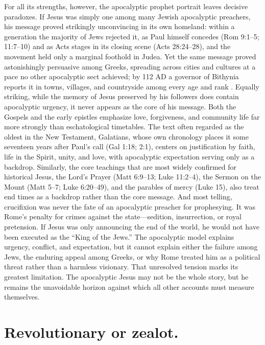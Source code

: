 For all its strengths, however, the apocalyptic prophet portrait leaves decisive paradoxes.
If Jesus was simply one among many Jewish apocalyptic preachers, his message proved strikingly unconvincing in its own homeland: within a generation the majority of Jews rejected it, as Paul himself concedes (Rom 9:1--5; 11:7--10) and as Acts stages in its closing scene (Acts 28:24--28), and the movement held only a marginal foothold in Judea.
Yet the same message proved astonishingly persuasive among Greeks, spreading across cities and cultures at a pace no other apocalyptic sect achieved; by 112 AD a governor of Bithynia reports it in towns, villages, and countryside among every age and rank \cite[10.96]{pliny:letters}.
Equally striking, while the memory of Jesus preserved by his followers does contain apocalyptic urgency, it never appears as the core of his message.
Both the Gospels and the early epistles emphasize love, forgiveness, and community life far more strongly than eschatological timetables.
The text often regarded as the oldest in the New Testament, Galatians, whose own chronology places it some seventeen years after Paul's call (Gal 1:18; 2:1), centers on justification by faith, life in the Spirit, unity, and love, with apocalyptic expectation serving only as a backdrop.
Similarly, the core teachings that are most widely confirmed for historical Jesus, the Lord's Prayer (Matt 6:9--13; Luke 11:2--4), the Sermon on the Mount (Matt 5--7; Luke 6:20--49), and the parables of mercy (Luke 15), also treat end times as a backdrop rather than the core message.
And most telling, crucifixion was never the fate of an apocalyptic preacher for prophesying.
It was Rome’s penalty for crimes against the state---sedition, insurrection, or royal pretension.
If Jesus was only announcing the end of the world, he would not have been executed as the “King of the Jews.”
The apocalyptic model explains urgency, conflict, and expectation, but it cannot explain either the failure among Jews, the enduring appeal among Greeks, or why Rome treated him as a political threat rather than a harmless visionary.
That unresolved tension marks its greatest limitation.
The apocalyptic Jesus may not be the whole story, but he remains the unavoidable horizon against which all other accounts must measure themselves.

\section{Revolutionary or zealot.}\label{sec:revolutionary}

